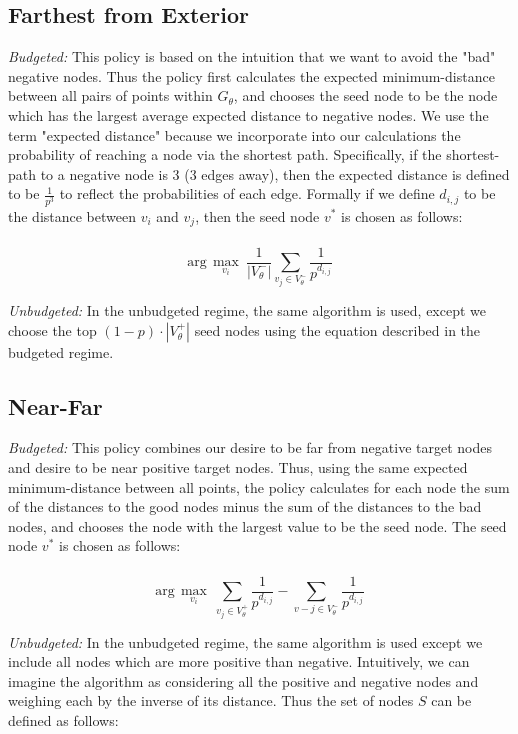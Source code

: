 \subsection{Farthest from Exterior}
\textit{Budgeted:}
This policy is based on the intuition that we want to avoid the "bad" negative nodes. Thus the policy first calculates the expected minimum-distance between all pairs of points within $G_\theta$, and chooses the seed node to be the node which has the largest average expected distance to negative nodes. We use the term "expected distance" because we incorporate into our calculations the probability of reaching a node via the shortest path. Specifically, if the shortest-path to a negative node is 3 (3 edges away), then the expected distance is defined to be $\frac{1}{p^3}$ to reflect the probabilities of each edge. Formally if we define $d_{i,j}$ to be the distance between $v_i$ and $v_j$, then the seed node $v^*$ is chosen as follows:
\\ \\
\begin{equation}
\text{arg}\,\max\limits_{v_i}\  \frac{1}{|V_{\theta}^-|} \sum_{v_j \in V_\theta^-} \frac{1}{p^{d_{i,j}}}
\end{equation}

\textit{Unbudgeted:}
In the unbudgeted regime, the same algorithm is used, except we choose the top $(1-p) \cdot |V_\theta^+|$ seed nodes using the equation described in the budgeted regime.

\subsection{Near-Far} 
\textit{Budgeted:}
This policy combines our desire to be far from negative target nodes and desire to be near positive target nodes. Thus, using the same expected minimum-distance between all points, the policy calculates for each node the sum of the distances to the good nodes minus the sum of the distances to the bad nodes, and chooses the node with the largest value to be the seed node. The seed node $v^*$ is chosen as follows:
\\ \\
\begin{equation}
\text{arg}\,\max\limits_{v_i}\  \sum_{v_j \in V_\theta^+} \frac{1}{p^{d_{i,j}}} -  \sum_{v-j \in V_{\theta}^-} \frac{1}{p^{d_{i,j}}}
\end{equation}

\textit{Unbudgeted:}
In the unbudgeted regime, the same algorithm is used except we include all nodes which are more positive than negative. Intuitively, we can imagine the algorithm as considering all the positive and negative nodes and weighing each by the inverse of its distance. Thus the set of nodes $S$ can be defined as follows:

